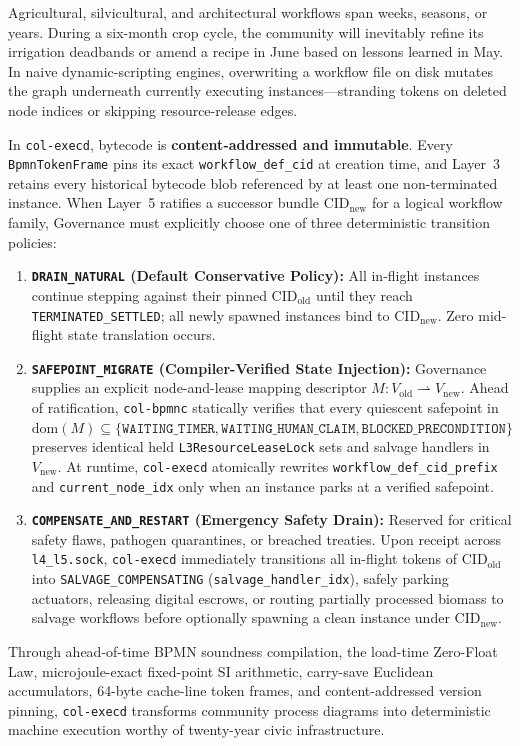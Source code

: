 Agricultural, silvicultural, and architectural workflows span weeks, seasons, or years.
During a six-month crop cycle, the community will inevitably refine its irrigation deadbands
or amend a recipe in June based on lessons learned in May. In naive dynamic-scripting
engines, overwriting a workflow file on disk mutates the graph underneath currently
executing instances---stranding tokens on deleted node indices or skipping resource-release
edges.

In \texttt{col-execd}, bytecode is \textbf{content-addressed and immutable}. Every
\texttt{BpmnTokenFrame} pins its exact \texttt{workflow\_def\_cid} at creation time, and
Layer~3 retains every historical bytecode blob referenced by at least one non-terminated
instance. When Layer~5 ratifies a successor bundle $\mathrm{CID}_{\mathrm{new}}$ for a
logical workflow family, Governance must explicitly choose one of three deterministic
transition policies:

\begin{enumerate}
\item \textbf{\texttt{DRAIN\_NATURAL} (Default Conservative Policy):} All in-flight
        instances continue stepping against their pinned $\mathrm{CID}_{\mathrm{old}}$ until
        they reach \texttt{TERMINATED\_SETTLED}; all newly spawned instances bind to
        $\mathrm{CID}_{\mathrm{new}}$. Zero mid-flight state translation occurs.
\item \textbf{\texttt{SAFEPOINT\_MIGRATE} (Compiler-Verified State Injection):} Governance
        supplies an explicit node-and-lease mapping descriptor $M: V_{\mathrm{old}} \rightharpoonup V_{\mathrm{new}}$.
        Ahead of ratification, \texttt{col-bpmnc} statically verifies that every quiescent
        safepoint in $\mathrm{dom}(M) \subseteq \{\texttt{WAITING\_TIMER}, \texttt{WAITING\_HUMAN\_CLAIM}, \texttt{BLOCKED\_PRECONDITION}\}$
        preserves identical held \texttt{L3ResourceLeaseLock} sets and salvage handlers in
        $V_{\mathrm{new}}$. At runtime, \texttt{col-execd} atomically rewrites
        \texttt{workflow\_def\_cid\_prefix} and \texttt{current\_node\_idx} only when an
        instance parks at a verified safepoint.
\item \textbf{\texttt{COMPENSATE\_AND\_RESTART} (Emergency Safety Drain):} Reserved for
        critical safety flaws, pathogen quarantines, or breached treaties. Upon receipt
        across \texttt{l4\_l5.sock}, \texttt{col-execd} immediately transitions all
        in-flight tokens of $\mathrm{CID}_{\mathrm{old}}$ into
        \texttt{SALVAGE\_COMPENSATING} (\texttt{salvage\_handler\_idx}), safely parking
        actuators, releasing digital escrows, or routing partially processed biomass to
        salvage workflows before optionally spawning a clean instance under
        $\mathrm{CID}_{\mathrm{new}}$.
\end{enumerate}

Through ahead-of-time BPMN soundness compilation, the load-time Zero-Float Law,
microjoule-exact fixed-point SI arithmetic, carry-save Euclidean accumulators, 64-byte
cache-line token frames, and content-addressed version pinning, \texttt{col-execd}
transforms community process diagrams into deterministic machine execution worthy of
twenty-year civic infrastructure.
